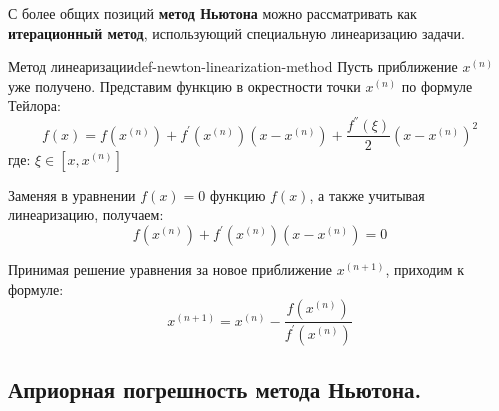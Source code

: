 \documentclass[14pt]{extarticle}
\begin{document}
    С более общих позиций \textbf{метод Ньютона} можно рассматривать как \textbf{итерационный метод}, использующий специальную линеаризацию задачи.

    \begin{definition}{Метод линеаризации}{def-newton-linearization-method}
        Пусть приближение $x^{(n)}$ уже получено. Представим функцию в окрестности точки $x^{(n)}$ по формуле Тейлора:
        $$f(x) = f(x^{(n)}) + f^{'}(x^{(n)})(x - x^{(n)}) + \frac{f^{''}(\xi)}{2}(x - x^{(n)})^{2}$$
        где: $\xi \in [x, x^{(n)}]$
        
        \vspace{\baselineskip}

        Заменяя в уравнении $f(x) = 0$ функцию $f(x)$, а также учитывая линеаризацию, получаем:
        $$f(x^{(n)}) + f^{'}(x^{(n)})(x - x^{(n)}) = 0$$

        Принимая решение уравнения за новое приближение $x^{(n + 1)}$, приходим к формуле:
        $$x^{(n + 1)} = x^{(n)} - \frac{f(x^{(n)})}{f^{'}(x^{(n)})}$$
    \end{definition}

\clearpage
\subsection{Априорная погрешность метода Ньютона.}
\end{document}
